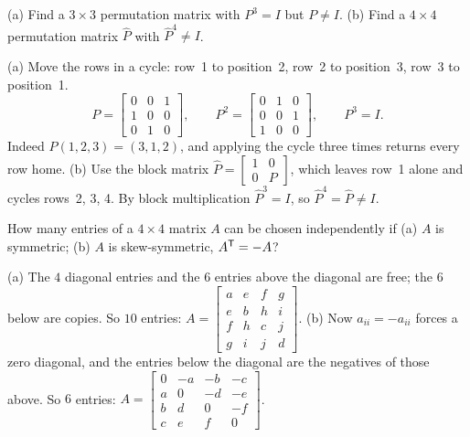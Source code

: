 \begin{exercise}\label{ex:u06-cycle}
(a) Find a $3\times3$ permutation matrix with $P^3=I$ but $P\neq I$. (b) Find a $4\times4$
permutation matrix $\widehat{P}$ with $\widehat{P}^4\neq I$.
\end{exercise}
\begin{solution}
(a) Move the rows in a cycle: row~1 to position~2, row~2 to position~3, row~3 to position~1.
\[
  P=\begin{bmatrix} 0&0&1\\ 1&0&0\\ 0&1&0\end{bmatrix},\qquad
  P^2=\begin{bmatrix} 0&1&0\\ 0&0&1\\ 1&0&0\end{bmatrix},\qquad P^3=I .
\]
Indeed $P(1,2,3)=(3,1,2)$, and applying the cycle three times returns every row home.
(b) Use the block matrix $\widehat{P}=\begin{bmatrix} 1&0\\ 0&P\end{bmatrix}$, which leaves
row~1 alone and cycles rows~2, 3, 4. By block multiplication $\widehat{P}^3=I$, so
$\widehat{P}^4=\widehat{P}\neq I$.
\end{solution}

\begin{exercise}\label{ex:u06-count}
How many entries of a $4\times4$ matrix $A$ can be chosen independently if (a) $A$ is
symmetric; (b) $A$ is skew-symmetric, $A^{\mathsf{T}}=-A$?
\end{exercise}
\begin{solution}
(a) The $4$ diagonal entries and the $6$ entries above the diagonal are free; the $6$ below
are copies. So $10$ entries:
$A=\begin{bmatrix} a&e&f&g\\ e&b&h&i\\ f&h&c&j\\ g&i&j&d\end{bmatrix}$.
(b) Now $a_{ii}=-a_{ii}$ forces a zero diagonal, and the entries below the diagonal are the
negatives of those above. So $6$ entries:
$A=\begin{bmatrix} 0&-a&-b&-c\\ a&0&-d&-e\\ b&d&0&-f\\ c&e&f&0\end{bmatrix}$.
\end{solution}

